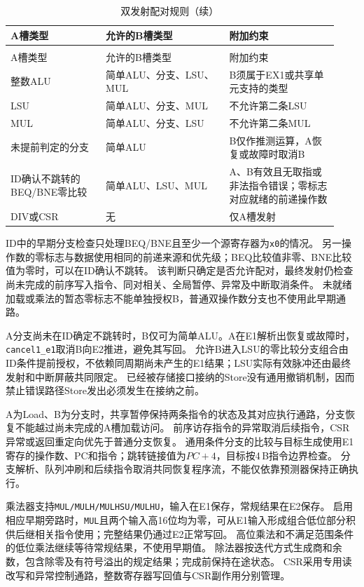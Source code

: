 \begin{reporttable}
\begin{longtable}{@{}p{0.27\linewidth}p{0.35\linewidth}p{0.31\linewidth}@{}}
\caption{双发射配对规则}\label{tbl:issue-pairing}\\
\toprule
A槽类型 & 允许的B槽类型 & 附加约束 \\
\midrule
\endfirsthead
\caption[]{双发射配对规则（续）}\\
\toprule
A槽类型 & 允许的B槽类型 & 附加约束 \\
\midrule
\endhead
\bottomrule
\endfoot
整数ALU & 简单ALU、分支、LSU、MUL & B须属于EX1或共享单元支持的类型 \\
LSU & 简单ALU、分支、MUL & 不允许第二条LSU \\
MUL & 简单ALU、分支、LSU & 不允许第二条MUL \\
未提前判定的分支 & 简单ALU & B仅作推测运算，A恢复或故障时取消B \\
ID确认不跳转的BEQ/BNE零比较 & 简单ALU、LSU、MUL & A、B有效且无取指或非法指令错误；零标志对应就绪的前递操作数 \\
DIV或CSR & 无 & 仅A槽发射 \\
\end{longtable}
\end{reporttable}

ID中的早期分支检查只处理BEQ/BNE且至少一个源寄存器为\texttt{x0}的情况。
另一操作数的零标志与数据使用相同的前递来源和优先级；BEQ比较值非零、BNE比较值为零时，可以在ID确认不跳转。
该判断只确定是否允许配对，最终发射仍检查尚未完成的前序写入指令、同对相关、全局暂停、异常及中断取消条件。
未就绪加载或乘法的暂态零标志不能单独授权B，普通双操作数分支也不使用此早期通路。

A分支尚未在ID确定不跳转时，B仅可为简单ALU。A在E1解析出恢复或故障时，\texttt{cancel1\_e1}取消B向E2推进，避免其写回。
允许B进入LSU的零比较分支组合由ID条件提前授权，不依赖同周期尚未产生的E1结果；LSU实际有效脉冲还由最终发射和中断屏蔽共同限定。
已经被存储接口接纳的Store没有通用撤销机制，因而禁止错误路径Store发出必须发生在接纳之前。

A为Load、B为分支时，共享暂停保持两条指令的状态及其对应执行通路，分支恢复不能越过尚未完成的A槽加载访问。
前序访存指令的异常取消后续指令，CSR异常或返回重定向优先于普通分支恢复。
通用条件分支的比较与目标生成使用E1寄存的操作数、PC和指令；跳转链接值为$PC+4$，目标按4\,B指令边界检查。
分支解析、队列冲刷和后续指令取消共同恢复程序流，不能仅依靠预测器保持正确执行。

乘法器支持\texttt{MUL/MULH/MULHSU/MULHU}，输入在E1保存，常规结果在E2保存。
启用相应早期旁路时，\texttt{MUL}且两个输入高16位均为零，可从E1输入形成组合低位部分积供后继相关指令使用；完整结果仍通过E2正常写回。
高位乘法和不满足范围条件的低位乘法继续等待常规结果，不使用早期值。
除法器按迭代方式生成商和余数，包含除零及有符号溢出的规定结果；完成前保持在途状态。
CSR采用专用读改写和异常控制通路，整数寄存器写回值与CSR副作用分别管理。


